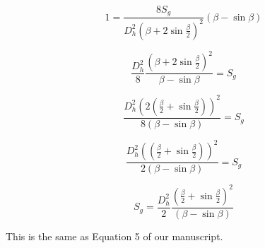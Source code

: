 \documentclass[11pt]{article}
\begin{document}
\begin{itemize}
  
  \begin{equation}
    1 = \frac{8 S_g}{D_h^2 (\beta +2\sin\frac{\beta}{2})^2} (\beta-\sin\beta)
  \end{equation}


  \begin{equation}
    \frac{D_h^2}{8} \frac{(\beta+2\sin\frac{\beta}{2})^2}{\beta - \sin \beta} = S_g
  \end{equation}

  \begin{equation}
    \frac{D_h^2 (2(\frac{\beta}{2}+\sin \frac{\beta}{2}))^2}{8(\beta - \sin \beta)} = S_g
  \end{equation}


   \begin{equation}
    \frac{D_h^2 ((\frac{\beta}{2}+\sin \frac{\beta}{2}))^2}{2(\beta - \sin \beta)} = S_g
  \end{equation}


  \begin{equation}
       S_g = \frac{D_h^2}{2} \frac{(\frac{\beta}{2}+\sin \frac{\beta}{2})^2}{(\beta - \sin \beta)}  
  \end{equation}

  This is the same as Equation 5 of our manuscript.

  

\end{itemize}

 

\end{document}
